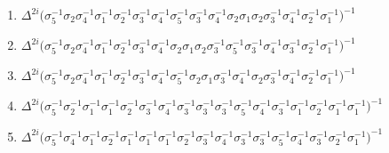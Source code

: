\vspace{0.3cm}
\begingroup
\raggedbottom
\begin{enumerate}
    \item $\displaystyle \Delta^{2i} \big( \allowbreak\sigma_{5}^{-1}\allowbreak\sigma_{2}\allowbreak\sigma_{4}^{-1}\allowbreak\sigma_{1}^{-1}\allowbreak\sigma_{2}^{-1}\allowbreak\sigma_{3}^{-1}\allowbreak\sigma_{4}^{-1}\allowbreak\sigma_{5}^{-1}\allowbreak\sigma_{3}^{-1}\allowbreak\sigma_{4}^{-1}\allowbreak\sigma_{2}\allowbreak\sigma_{1}\allowbreak\sigma_{2}\allowbreak\sigma_{3}^{-1}\allowbreak\sigma_{4}^{-1}\allowbreak\sigma_{2}^{-1}\allowbreak\sigma_{1}^{-1} \big)^{-1}$
    \item $\displaystyle \Delta^{2i} \big( \allowbreak\sigma_{5}^{-1}\allowbreak\sigma_{2}\allowbreak\sigma_{4}^{-1}\allowbreak\sigma_{1}^{-1}\allowbreak\sigma_{2}^{-1}\allowbreak\sigma_{3}^{-1}\allowbreak\sigma_{4}^{-1}\allowbreak\sigma_{2}\allowbreak\sigma_{1}\allowbreak\sigma_{2}\allowbreak\sigma_{3}^{-1}\allowbreak\sigma_{5}^{-1}\allowbreak\sigma_{3}^{-1}\allowbreak\sigma_{4}^{-1}\allowbreak\sigma_{3}^{-1}\allowbreak\sigma_{2}^{-1}\allowbreak\sigma_{1}^{-1} \big)^{-1}$
    \item $\displaystyle \Delta^{2i} \big( \allowbreak\sigma_{5}^{-1}\allowbreak\sigma_{2}\allowbreak\sigma_{4}^{-1}\allowbreak\sigma_{1}^{-1}\allowbreak\sigma_{2}^{-1}\allowbreak\sigma_{3}^{-1}\allowbreak\sigma_{4}^{-1}\allowbreak\sigma_{5}^{-1}\allowbreak\sigma_{2}\allowbreak\sigma_{1}\allowbreak\sigma_{3}^{-1}\allowbreak\sigma_{4}^{-1}\allowbreak\sigma_{2}\allowbreak\sigma_{3}^{-1}\allowbreak\sigma_{4}^{-1}\allowbreak\sigma_{2}^{-1}\allowbreak\sigma_{1}^{-1} \big)^{-1}$
    \item $\displaystyle \Delta^{2i} \big( \allowbreak\sigma_{5}^{-1}\allowbreak\sigma_{2}^{-1}\allowbreak\sigma_{1}^{-1}\allowbreak\sigma_{1}^{-1}\allowbreak\sigma_{2}^{-1}\allowbreak\sigma_{3}^{-1}\allowbreak\sigma_{4}^{-1}\allowbreak\sigma_{3}^{-1}\allowbreak\sigma_{3}^{-1}\allowbreak\sigma_{3}^{-1}\allowbreak\sigma_{5}^{-1}\allowbreak\sigma_{4}^{-1}\allowbreak\sigma_{3}^{-1}\allowbreak\sigma_{1}^{-1}\allowbreak\sigma_{2}^{-1}\allowbreak\sigma_{1}^{-1}\allowbreak\sigma_{1}^{-1} \big)^{-1}$
    \item $\displaystyle \Delta^{2i} \big( \allowbreak\sigma_{5}^{-1}\allowbreak\sigma_{4}^{-1}\allowbreak\sigma_{1}^{-1}\allowbreak\sigma_{2}^{-1}\allowbreak\sigma_{1}^{-1}\allowbreak\sigma_{1}^{-1}\allowbreak\sigma_{1}^{-1}\allowbreak\sigma_{2}^{-1}\allowbreak\sigma_{3}^{-1}\allowbreak\sigma_{4}^{-1}\allowbreak\sigma_{3}^{-1}\allowbreak\sigma_{3}^{-1}\allowbreak\sigma_{5}^{-1}\allowbreak\sigma_{4}^{-1}\allowbreak\sigma_{3}^{-1}\allowbreak\sigma_{2}^{-1}\allowbreak\sigma_{1}^{-1} \big)^{-1}$

\end{enumerate}
